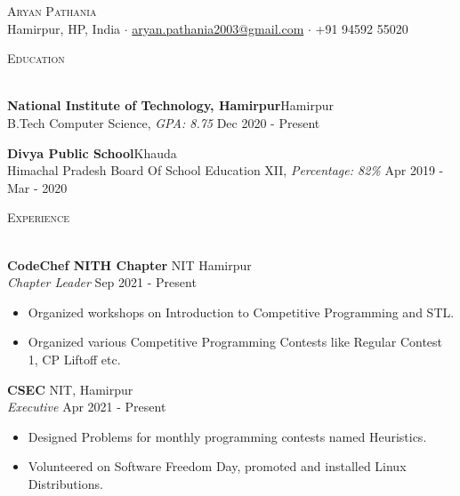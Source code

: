 \documentclass[a4paper]{article}
\newcommand{\lineunder} {
    \vspace*{-8pt} \\
    \hspace*{-18pt} \hrulefill \\
}
\newcommand{\header} [1] {
    {\hspace*{-18pt}\vspace*{6pt} \textsc{#1}}
    \vspace*{-6pt} \lineunder
}
\begin{document}
\vspace*{-40pt}



\vspace*{-10pt}
\begin{center}
	{\Huge \scshape {Aryan Pathania}}\\
	Hamirpur, HP, India $\cdot$ \href{mailto: aryan.pathania2003@gmail.com}{aryan.pathania2003@gmail.com} $\cdot$ +91 94592 55020\\
\end{center}

\header{Education}
\vspace{1mm}

\textbf{National Institute of Technology, Hamirpur}\hfill Hamirpur\\
B.Tech Computer Science, \textit{GPA: 8.75} \hfill Dec 2020 - Present\\
\vspace{2mm}

\textbf{Divya Public School}\hfill Khauda\\
Himachal Pradesh Board Of School Education XII, \textit{Percentage: 82\%} \hfill Apr 2019 - Mar - 2020\\
\vspace{2mm}

\header{Experience}
\vspace{1mm}

\textbf{CodeChef NITH Chapter} \hfill NIT Hamirpur\\
\textit{Chapter Leader} \hfill Sep 2021 - Present\\
\vspace{-2mm}
\begin{itemize} \itemsep -4pt
	\item Organized workshops on Introduction to Competitive Programming and STL.
	\item Organized various Competitive Programming Contests like Regular Contest 1, CP Liftoff etc.
\end{itemize}

\vspace{-1mm}
\textbf{CSEC} \hfill NIT, Hamirpur\\
\textit{Executive} \hfill Apr 2021 - Present\\
\vspace{-2mm}
\begin{itemize} \itemsep -4pt
	\item Designed Problems for monthly programming contests named Heuristics.
	\item Volunteered on Software Freedom Day, promoted and installed Linux Distributions.
\end{itemize}
\end{document}
